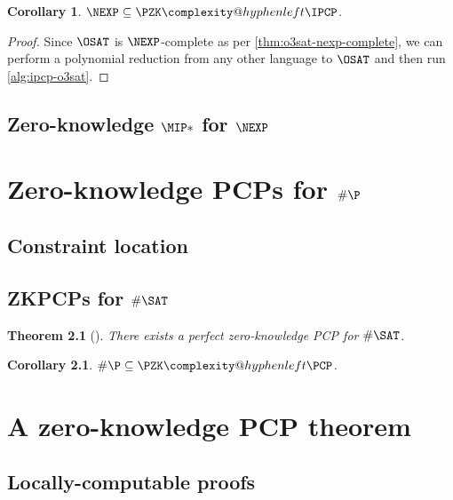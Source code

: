 \documentclass[english,12pt]{reedthesis}
\makeatletter
\theoremstyle{plain}
\newtheorem{thm}{Theorem}[section]
\newtheorem{cor}[cor]{Corollary}
\theoremstyle{definition}
\theoremstyle{remark}
\newcommand{\PZKPCP}{%
  \PZK\complexity@hyphenleft\PCP
}
\newcommand{\PZKIPCP}{%
  \PZK\complexity@hyphenleft\IPCP
}
\makeatother
\begin{document}
\begin{cor}\label{nexp-pzkipcp}
  $\NEXP \subseteq \PZKIPCP$.
\end{cor}

\begin{proof}
  Since $\OSAT$ is $\NEXP$-complete as per \cref{thm:o3sat-nexp-complete}, we
  can perform a polynomial reduction from any other language to $\OSAT$ and then
  run \cref{alg:ipcp-o3sat}.
\end{proof}

\section{Zero-knowledge $\MIP*$ for $\NEXP$}\label{sec:zk-mipstar-nexp}

\chapter{Zero-knowledge PCPs for $\#\P$}\label{chap:zk-pcp-for-hp}

\section{Constraint location}\label{sec:constraint-loc}

\section{ZKPCPs for $\#\SAT$}\label{sec:zkpcp-hsat}

\begin{thm}[{\cite[Theorem 8.1]{GOS24}}]\label{thm:pzkpcp-for-sat}
  There exists a perfect zero-knowledge PCP for $\#\SAT$.
\end{thm}

\begin{cor}\label{cor:hashp-subset-pzkpcp}
  $\#\P \subseteq \PZKPCP$.
\end{cor}

\chapter{A zero-knowledge PCP theorem}\label{chap:zk-pcp-theorem}

\section{Locally-computable proofs}\label{sec:loc-comp-proof}

\end{document}
